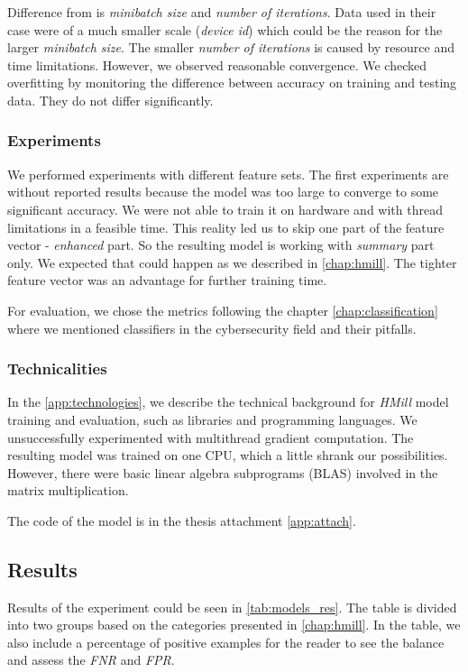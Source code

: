 Difference from \cite{Mandlik2020} is \emph{minibatch size} and \emph{number of iterations}. Data used in their case were of a much smaller scale (\emph{device id}) which could be the reason for the larger \emph{minibatch size}. The smaller \emph{number of iterations} is caused by resource and time limitations. However, we observed reasonable convergence.  We checked overfitting by monitoring the difference between accuracy on training and testing data. They do not differ significantly.

\subsubsection{Experiments}
We performed experiments with different feature sets. The first experiments are without reported results because the model was too large to converge to some significant accuracy. We were not able to train it on hardware and with thread limitations in a feasible time. This reality led us to skip one part of the feature vector - \emph{enhanced} part. So the resulting model is working with \emph{summary} part only.  We expected that could happen as we described in \ref{chap:hmill}. The tighter feature vector was an advantage for further training time.

For evaluation, we chose the metrics following the chapter \ref{chap:classification} where we mentioned classifiers in the cybersecurity field and their pitfalls.

\subsubsection{Technicalities}
In the \ref{app:technologies}, we describe the technical background for \emph{HMill} model training and evaluation, such as libraries and programming languages. We unsuccessfully experimented with multithread gradient computation. The resulting model was trained on one CPU, which a little shrank our possibilities. However, there were basic linear algebra subprograms (BLAS) involved in the matrix multiplication.

The code of the model is in the thesis attachment \ref{app:attach}.

\subsection{Results}
Results of the experiment could be seen in \ref{tab:models_res}. The table is divided into two groups based on the categories presented in \ref{chap:hmill}. In the table, we also include a percentage of positive examples for the reader to see the balance and assess the \emph{FNR} and \emph{FPR}.


